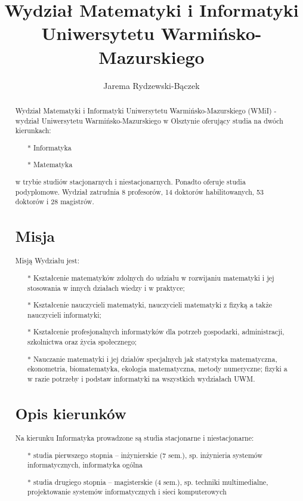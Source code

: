 \documentclass[a4paper,12pt]{article}
\title{ Wydział Matematyki i Informatyki Uniwersytetu Warmińsko-Mazurskiego }
\author{Jarema Rydzewski-Bączek}
\begin{document}
\maketitle

\begin{abstract}
Wydział Matematyki i Informatyki Uniwersytetu Warmińsko-Mazurskiego (WMiI) - wydział Uniwersytetu Warmińsko-Mazurskiego w Olsztynie oferujący studia na dwóch kierunkach:
\begin{itemize}
\item[*] Informatyka
\item[*] Matematyka
\end{itemize}
w trybie studiów stacjonarnych i niestacjonarnych. Ponadto oferuje studia podyplomowe.
Wydział zatrudnia 8 profesorów, 14 doktorów habilitowanych, 53 doktorów i 28 magistrów.

\section{Misja}

Misją Wydziału jest:

\begin{itemize}
\item[*]Kształcenie matematyków zdolnych do udziału w rozwijaniu matematyki i jej stosowania w innych działach wiedzy i w praktyce;
\item[*]Kształcenie nauczycieli matematyki, nauczycieli matematyki z fizyką a także nauczycieli informatyki;
\item[*]Kształcenie profesjonalnych informatyków dla potrzeb gospodarki, administracji, szkolnictwa oraz życia społecznego;
\item[*]Nauczanie matematyki i jej działów specjalnych jak statystyka matematyczna, ekonometria,
biomatematyka, ekologia matematyczna, metody numeryczne; fizyki a w razie potrzeby i podstaw
informatyki na wszystkich wydziałach UWM.
\end{itemize}

\section{Opis kierunków}

Na kierunku Informatyka prowadzone są studia stacjonarne i niestacjonarne:

\begin{itemize}
\item[*]studia pierwszego stopnia – inżynierskie (7 sem.), sp. inżynieria systemów informatycznych, informatyka ogólna
\item[*]studia drugiego stopnia – magisterskie (4 sem.), sp. techniki multimedialne, projektowanie systemów informatycznych i sieci komputerowych
\end{itemize}


\end{abstract}
\end{document}
